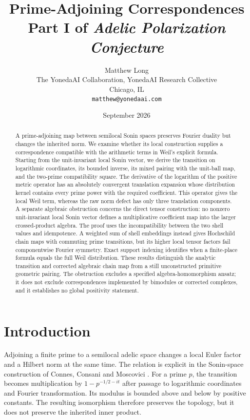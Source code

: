 \documentclass[11pt,letterpaper]{article}
\title{Prime-Adjoining Correspondences\\[4pt]
  {\normalsize Part I of \emph{Adelic Polarization Conjecture}}}
\author{Matthew Long\\
  \small The YonedaAI Collaboration, YonedaAI Research Collective\\
  \small Chicago, IL\\
  \small \texttt{matthew@yonedaai.com}}
\date{September 2026}
\theoremstyle{definition}
\theoremstyle{remark}
\begin{document}
\maketitle
\begin{abstract}
A prime-adjoining map between semilocal Sonin spaces preserves Fourier duality but changes the inherited norm. We examine whether its local construction supplies a correspondence compatible with the arithmetic terms in Weil's explicit formula. Starting from the unit-invariant local Sonin vector, we derive the transition on logarithmic coordinates, its bounded inverse, its mixed pairing with the unit-ball map, and the two-prime compatibility square. The derivative of the logarithm of the positive metric operator has an absolutely convergent translation expansion whose distribution kernel contains every prime power with the required coefficient. This operator gives the local Weil term, whereas the raw norm defect has only three translation components. A separate algebraic obstruction concerns the direct tensor construction: no nonzero unit-invariant local Sonin vector defines a multiplicative coefficient map into the larger crossed-product algebra. The proof uses the incompatibility between the two shell values and idempotence. A weighted sum of shell embeddings instead gives Hochschild chain maps with commuting prime transitions, but its higher local tensor factors fail componentwise Fourier symmetry. Exact support indexing identifies when a finite-place formula equals the full Weil distribution. These results distinguish the analytic transition and corrected algebraic chain map from a still unconstructed primitive geometric pairing. The obstruction excludes a specified algebra-homomorphism ansatz; it does not exclude correspondences implemented by bimodules or corrected complexes, and it establishes no global positivity statement.
\end{abstract}

\section{Introduction}

Adjoining a finite prime to a semilocal adelic space changes a local Euler
factor and a Hilbert norm at the same time. The relation is explicit in the
Sonin-space construction of Connes, Consani and Moscovici
\cite{CCM}. For a prime $p$, the transition becomes multiplication by
$1-p^{-1/2-it}$ after passage to logarithmic coordinates and Fourier
transformation. Its modulus is bounded above and below by positive
constants. The resulting isomorphism therefore preserves the topology,
but it does not preserve the inherited inner product.
\end{document}
